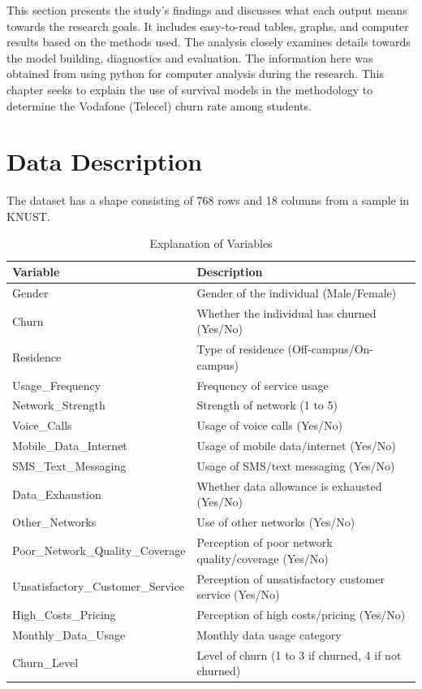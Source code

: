 \documentclass[doublespacing]{report} %
\begin{document}
This section presents the study's findings and discusses what each output means towards the research goals. It includes easy-to-read tables, graphs, and computer results based on the methods used. The analysis closely examines details towards the model building, diagnostics and evaluation. The information here was obtained from using python for computer analysis during the research. This chapter seeks to explain the use of survival models in the methodology to determine the Vodafone (Telecel) churn rate among students.

\section{Data Description}

The dataset has a shape consisting of 768 rows and 18 columns from a sample in KNUST.

\begin{table}[H]
    \centering
    \begin{tabular}{ll}
        \toprule
        Variable & Description \\
        \midrule
        Gender & Gender of the individual (Male/Female) \\
        Churn & Whether the individual has churned (Yes/No) \\
        Residence & Type of residence (Off-campus/On-campus) \\
        Usage\_Frequency & Frequency of service usage  \\
        Network\_Strength & Strength of network (1 to 5) \\
        Voice\_Calls & Usage of voice calls (Yes/No) \\
        Mobile\_Data\_Internet & Usage of mobile data/internet (Yes/No) \\
        SMS\_Text\_Messaging & Usage of SMS/text messaging (Yes/No) \\
        Data\_Exhaustion & Whether data allowance is exhausted (Yes/No) \\
        Other\_Networks & Use of other networks (Yes/No) \\
        Poor\_Network\_Quality\_Coverage & Perception of poor network quality/coverage (Yes/No) \\
        Unsatisfactory\_Customer\_Service & Perception of unsatisfactory customer service (Yes/No) \\
        High\_Costs\_Pricing & Perception of high costs/pricing (Yes/No) \\
        Monthly\_Data\_Usage & Monthly data usage category  \\
        Churn\_Level & Level of churn (1 to 3 if churned, 4 if not churned) \\
        \bottomrule
    \end{tabular}
    \caption{Explanation of Variables}
\end{table}
\end{document}
